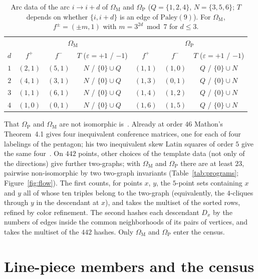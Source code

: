 \documentclass[11pt]{amsart}
\theoremstyle{definition}
\theoremstyle{remark}
\newcommand{\Pal}{\mathrm{Paley}}
\newcommand{\OM}{\Omega_{\mathrm M}}   %
\newcommand{\OP}{\Omega_{\mathrm P}}   %
\begin{document}
\begin{table}[h]
\centering
\begin{tabular}{c|ccc|ccc}
\toprule
 & \multicolumn{3}{c|}{$\OM$} & \multicolumn{3}{c}{$\OP$}\\
$d$ & $f^+$ & $f^-$ & $T$ ($\varepsilon=+1$ / $-1$) & $f^+$ & $f^-$ & $T$ ($\varepsilon=+1$ / $-1$)\\
\midrule
$1$ & $(2,1)$ & $(5,1)$ & $N$ / $\{0\}\cup Q$ & $(1,1)$ & $(1,0)$ & $Q$ / $\{0\}\cup N$\\
$2$ & $(4,1)$ & $(3,1)$ & $N$ / $\{0\}\cup Q$ & $(1,3)$ & $(0,1)$ & $Q$ / $\{0\}\cup N$\\
$3$ & $(1,1)$ & $(6,1)$ & $N$ / $\{0\}\cup Q$ & $(1,4)$ & $(1,2)$ & $Q$ / $\{0\}\cup N$\\
$4$ & $(1,0)$ & $(0,1)$ & $N$ / $\{0\}\cup Q$ & $(1,6)$ & $(1,5)$ & $Q$ / $\{0\}\cup N$\\
\bottomrule
\end{tabular}
\caption{Arc data of the arc $i\to i+d$ of $\OM$ and $\OP$ ($Q=\{1,2,4\}$, $N=\{3,5,6\}$; $T$ depends on whether
$\{i,i+d\}$ is an edge of $\Pal(9)$). For $\OM$, $f^\pm=(\pm m,1)$ with $m=3^{2d}\bmod7$ for $d\le3$.}
\label{tab:arcs}
\end{table}

That $\OP$ and $\OM$ are not isomorphic is~\cite[Computation~6.7]{K833}. Already at order $46$ Mathon's Theorem~4.1
gives four inequivalent conference matrices, one for each of four labelings of the pentagon; his two inequivalent
skew Latin squares of order $5$ give the same four~\cite[p.~330]{Mathon1978}. On $442$ points, other choices of the
template data (not only of the directions) give further two-graphs; with $\OM$ and $\OP$ there are at least $23$,
pairwise non-isomorphic by two two-graph invariants (Table~\ref{tab:programs}; Figure~\ref{fig:flow}). The first counts,
for points $x$, $y$, the $5$-point sets containing $x$ and $y$ all of whose ten triples belong to the two-graph
(equivalently, the $4$-cliques through $y$ in the descendant at $x$), and takes the multiset of the sorted rows,
refined by color refinement. The second hashes each descendant $D_x$ by the numbers of edges inside the common
neighborhoods of its pairs of vertices, and takes the multiset of the $442$ hashes. Only $\OM$ and $\OP$ enter the
census.

\section{Line-piece members and the census}\label{sec:census}
\end{document}
